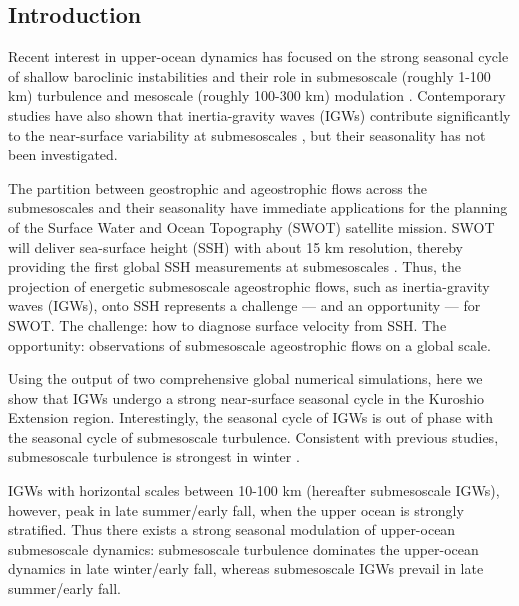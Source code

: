 \documentclass[grl]{agutex2015}
\begin{document}
\begin{article}

%
%

\section{Introduction}

Recent interest in upper-ocean dynamics has focused on the strong seasonal
cycle of shallow baroclinic instabilities and their role in submesoscale (roughly 1-100 km)
turbulence and mesoscale (roughly 100-300 km) modulation \citep{sasaki_etal2014,qiu_etal2014,
brannigan_etal2015,callies_etal2015, thompson_etal2016,buckingham_etal2016}. Contemporary studies
have also shown that inertia-gravity waves (IGWs) contribute significantly
to the near-surface variability at submesoscales \citep{richman_etal2012,
buhler_etal2014,rocha_etal2016}, but their seasonality has not been investigated.

The partition between geostrophic and ageostrophic flows across
the submesoscales and their seasonality have immediate applications for the planning
of the Surface Water and Ocean Topography (SWOT) satellite mission.
SWOT will deliver
sea-surface height (SSH) with about 15 km resolution, thereby providing the
first global SSH measurements at submesoscales \citep{fu_ubelmann2014}.
Thus, the projection of energetic submesoscale ageostrophic flows, such as
inertia-gravity waves (IGWs), onto SSH represents
a challenge --- and an opportunity --- for SWOT. The challenge: how to diagnose
surface velocity from SSH. The opportunity: observations of submesoscale ageostrophic
flows on a global scale.


Using the output of two comprehensive global numerical simulations, here we show
that IGWs undergo
a strong near-surface seasonal cycle in the Kuroshio Extension region.
Interestingly, the seasonal cycle of IGWs is out of phase
with the seasonal cycle of submesoscale turbulence. Consistent with previous studies,
submesoscale turbulence is strongest  in winter \citep{sasaki_etal2014,qiu_etal2014}.

IGWs with horizontal scales between 10-100 km (hereafter submesoscale IGWs),
however, peak in late summer/early fall,
when the upper ocean is strongly stratified. Thus there exists a
strong seasonal modulation of upper-ocean submesoscale dynamics:
submesoscale turbulence dominates the upper-ocean dynamics in late winter/early fall,
whereas submesoscale IGWs prevail in late summer/early fall.



\end{article}
\end{document}
